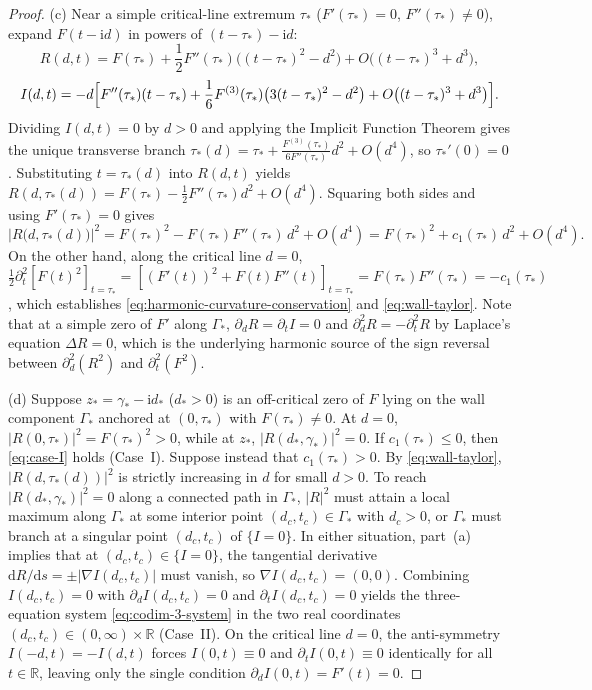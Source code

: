 \documentclass[11pt,reqno]{amsart}
\theoremstyle{definition}
\theoremstyle{remark}
\numberwithin{equation}{section}
\newcommand{\dd}{\mathrm{d}}
\newcommand{\ii}{\mathrm{i}}
\begin{document}
\begin{proof}
(c) Near a simple critical-line extremum $\tau_*$ ($F'(\tau_*)=0$, $F''(\tau_*)\ne 0$), expand $F(t-\ii d)$ in powers of $(t-\tau_*) - \ii d$:
\[
R(d,t) = F(\tau_*) + \frac{1}{2}F''(\tau_*)\bigl((t-\tau_*)^2 - d^2\bigr) + O\bigl((t-\tau_*)^3 + d^3\bigr),
\]
\[
I(d,t) = -d\Bigl[F''(\tau_*)(t-\tau_*) + \frac{1}{6}F^{(3)}(\tau_*)\bigl(3(t-\tau_*)^2 - d^2\bigr) + O\bigl((t-\tau_*)^3 + d^3\bigr)\Bigr].
\]
Dividing $I(d,t)=0$ by $d>0$ and applying the Implicit Function Theorem gives the unique transverse branch $\tau_*(d) = \tau_* + \frac{F^{(3)}(\tau_*)}{6F''(\tau_*)}d^2 + O(d^4)$, so $\tau_*'(0)=0$. Substituting $t = \tau_*(d)$ into $R(d,t)$ yields $R(d,\tau_*(d)) = F(\tau_*) - \frac{1}{2}F''(\tau_*)d^2 + O(d^4)$. Squaring both sides and using $F'(\tau_*)=0$ gives
\[
\bigl|R\bigl(d,\tau_*(d)\bigr)\bigr|^2 = F(\tau_*)^2 - F(\tau_*)F''(\tau_*)\,d^2 + O(d^4) = F(\tau_*)^2 + c_1(\tau_*)\,d^2 + O(d^4).
\]
On the other hand, along the critical line $d=0$, $\frac{1}{2}\partial_t^2[F(t)^2]_{t=\tau_*} = [(F'(t))^2 + F(t)F''(t)]_{t=\tau_*} = F(\tau_*)F''(\tau_*) = -c_1(\tau_*)$, which establishes \eqref{eq:harmonic-curvature-conservation} and \eqref{eq:wall-taylor}. Note that at a simple zero of $F'$ along $\Gamma_*$, $\partial_d R = \partial_t I = 0$ and $\partial_d^2 R = -\partial_t^2 R$ by Laplace's equation $\Delta R = 0$, which is the underlying harmonic source of the sign reversal between $\partial_d^2(R^2)$ and $\partial_t^2(F^2)$.

(d) Suppose $z_* = \gamma_* - \ii d_*$ ($d_* > 0$) is an off-critical zero of $F$ lying on the wall component $\Gamma_*$ anchored at $(0,\tau_*)$ with $F(\tau_*)\ne 0$. At $d=0$, $|R(0,\tau_*)|^2 = F(\tau_*)^2 > 0$, while at $z_*$, $|R(d_*,\gamma_*)|^2 = 0$. If $c_1(\tau_*) \le 0$, then \eqref{eq:case-I} holds (Case~I). Suppose instead that $c_1(\tau_*) > 0$. By \eqref{eq:wall-taylor}, $|R(d,\tau_*(d))|^2$ is strictly increasing in $d$ for small $d>0$. To reach $|R(d_*,\gamma_*)|^2 = 0$ along a connected path in $\Gamma_*$, $|R|^2$ must attain a local maximum along $\Gamma_*$ at some interior point $(d_c,t_c) \in \Gamma_*$ with $d_c > 0$, or $\Gamma_*$ must branch at a singular point $(d_c,t_c)$ of $\{I=0\}$. In either situation, part~(a) implies that at $(d_c,t_c) \in \{I=0\}$, the tangential derivative $\dd R/\dd s = \pm |\nabla I(d_c,t_c)|$ must vanish, so $\nabla I(d_c,t_c) = (0,0)$. Combining $I(d_c,t_c)=0$ with $\partial_d I(d_c,t_c)=0$ and $\partial_t I(d_c,t_c)=0$ yields the three-equation system \eqref{eq:codim-3-system} in the two real coordinates $(d_c,t_c) \in (0,\infty)\times\mathbb{R}$ (Case~II). On the critical line $d=0$, the anti-symmetry $I(-d,t)=-I(d,t)$ forces $I(0,t)\equiv 0$ and $\partial_t I(0,t)\equiv 0$ identically for all $t \in \mathbb{R}$, leaving only the single condition $\partial_d I(0,t) = F'(t) = 0$.
\end{proof}
\end{document}
